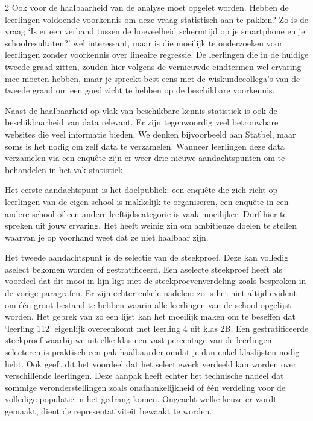 \begin{multicols}{2}
Ook voor de haalbaarheid van de analyse moet opgelet worden. Hebben de leerlingen voldoende voorkennis om deze vraag statistisch aan te pakken? Zo is de vraag `Is er een verband tussen de hoeveelheid schermtijd op je smartphone en je schoolresultaten?' wel interessant, maar is die moeilijk te onderzoeken voor leerlingen zonder voorkennis over lineaire regressie. De leerlingen die in de huidige tweede graad zitten, zouden hier volgens de vernieuwde eindtermen wel ervaring mee moeten hebben, maar je spreekt best eens met de wiskundecollega's van de tweede graad om een goed zicht te hebben op de beschikbare voorkennis.

Naast de haalbaarheid op vlak van beschikbare kennis statistiek is ook de beschikbaarheid van data relevant. Er zijn tegenwoordig veel betrouwbare websites die veel informatie bieden. We denken bijvoorbeeld aan Statbel, maar soms is het nodig om zelf data te verzamelen. Wanneer leerlingen deze data verzamelen via een enqu\^ete zijn er weer drie nieuwe aandachtspunten om te behandelen in het vak statistiek.

Het eerste aandachtspunt is het doelpubliek: een enqu\^ete die zich richt op leerlingen van de eigen school is makkelijk te organiseren, een enqu\^ete in een andere school of een andere leeftijdscategorie is vaak moeilijker. Durf hier te spreken uit jouw ervaring. Het heeft weinig zin om ambitieuze doelen te stellen waarvan je op voorhand weet dat ze niet haalbaar zijn. 

Het tweede aandachtspunt is de selectie van de steekproef. Deze kan volledig aselect bekomen worden of gestratificeerd. Een aselecte steekproef heeft als voordeel dat dit mooi in lijn ligt met de steekproevenverdeling zoals besproken in de vorige paragrafen. Er zijn echter enkele nadelen: zo is het niet altijd evident om één groot bestand te hebben waarin alle leerlingen van de school opgelijst worden. Het gebrek van zo een lijst kan het moeilijk maken om te beseffen dat `leerling 112' eigenlijk overeenkomt met leerling 4 uit klas 2B. Een gestratificeerde steekproef waarbij we uit elke klas een vast percentage van de leerlingen selecteren is praktisch een pak haalbaarder omdat je dan enkel klaslijsten nodig hebt. Ook geeft dit het voordeel dat het selectiewerk verdeeld kan worden over verschillende leerlingen. Deze aanpak heeft echter het technische nadeel dat sommige veronderstellingen zoals onafhankelijkheid of \'e\'en verdeling voor de volledige populatie in het gedrang komen. Ongeacht welke keuze er wordt gemaakt, dient de representativiteit bewaakt te worden.
            

\end{multicols}
